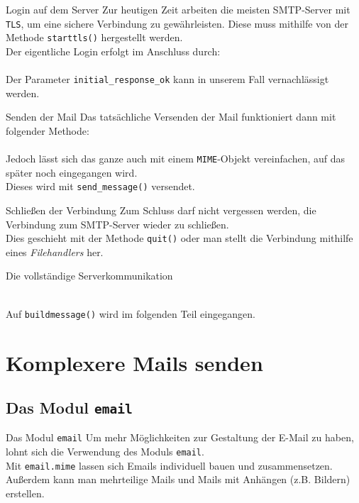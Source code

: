 \begin{frame}[fragile]{Login auf dem Server}
	Zur heutigen Zeit arbeiten die meisten SMTP-Server mit \texttt{TLS}, um eine sichere Verbindung zu gewährleisten. Diese muss mithilfe von der Methode \texttt{starttls()} hergestellt werden.\\[.25cm]
	Der eigentliche Login erfolgt im Anschluss durch:\\
	
	\ \\[.25cm]
	Der Parameter \texttt{initial\_response\_ok} kann in unserem Fall vernachlässigt werden.
\end{frame}

\begin{frame}[fragile]{Senden der Mail}
	Das tatsächliche Versenden der Mail funktioniert dann mit folgender Methode:\\[.25cm]
	
	\ \\[.25cm]
	Jedoch l\"asst sich das ganze auch mit einem \texttt{MIME}-Objekt vereinfachen, auf das später noch eingegangen wird. \\
	Dieses wird mit \texttt{send\_message()} versendet.
\end{frame}

\begin{frame}{Schließen der Verbindung}
	Zum Schluss darf nicht vergessen werden, die Verbindung zum SMTP-Server wieder zu schließen.\\
	Dies geschieht mit der Methode \texttt{quit()} oder man stellt die Verbindung mithilfe eines \textit{Filehandlers} her.
\end{frame}

\begin{frame}[fragile]{Die vollst\"andige Serverkommunikation}
	
	\ \\[1cm]
	Auf \texttt{buildmessage()} wird im folgenden Teil eingegangen.
\end{frame}

\section{Komplexere Mails senden}
\subsection{Das Modul \texttt{email}}
\begin{frame}[fragile]{Das Modul \texttt{email}}
	Um mehr Möglichkeiten zur Gestaltung der E-Mail zu haben, lohnt sich die Verwendung des Moduls \texttt{email}.\\[.5cm]
	Mit \texttt{email.mime} lassen sich Emails individuell bauen und zusammensetzen. Außerdem kann man mehrteilige Mails und Mails mit Anhängen (z.B. Bildern) erstellen.
\end{frame}

